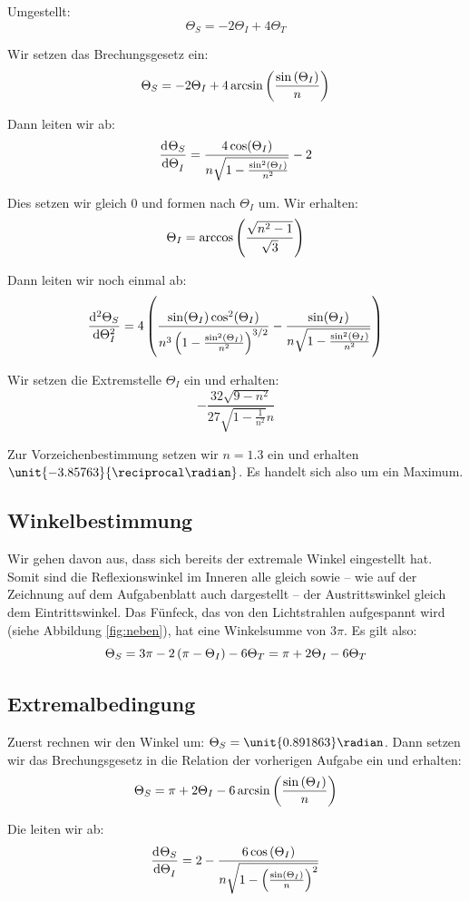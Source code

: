 \documentclass[11pt, ngerman, fleqn]{article}
\begin{document}
Umgestellt:
\[
	\Theta_S = - 2 \Theta_I + 4 \Theta_T
\]

Wir setzen das Brechungsgesetz ein:
\[
	\Theta_S = - 2 \Theta_I + 4 \arcsin\del{\frac{\sin\del{\Theta_I}} n}
\]

Dann leiten wir ab:
\[
	\dod{\Theta_S}{\Theta_I} = \frac{4 \cos (\Theta_I)}{n \sqrt{1-\frac{\sin ^2(\Theta_I)}{n^2}}}-2 
\]

Dies setzen wir gleich 0 und formen nach $\Theta_I$ um. Wir erhalten:
\[
	\Theta_I = \arccos\del{\frac{\sqrt{n^2-1}}{\sqrt{3}}}
\]

Dann leiten wir noch einmal ab:
\[
	\dod[2]{\Theta_S}{\Theta_I} = 4 \left(\frac{\sin (\Theta_I) \cos ^2(\Theta_I)}{n^3 \left(1-\frac{\sin ^2(\Theta_I)}{n^2}\right)^{3/2}}-\frac{\sin (\Theta_I)}{n \sqrt{1-\frac{\sin ^2(\Theta_I)}{n^2}}}\right) 
\]

Wir setzen die Extremstelle $\Theta_I$ ein und erhalten:
\[
	-\frac{32 \sqrt{9-n^2}}{27 \sqrt{1-\frac{1}{n^2}} n}
\]

Zur Vorzeichenbestimmung setzen wir $n = 1.3$ ein und erhalten
$\unit{-3.85763}{\reciprocal\radian}$. Es handelt sich also um ein Maximum.

\subsection{Winkelbestimmung}

Wir gehen davon aus, dass sich bereits der extremale Winkel eingestellt hat.
Somit sind die Reflexionswinkel im Inneren alle gleich sowie -- wie auf der
Zeichnung auf dem Aufgabenblatt auch dargestellt -- der Austrittswinkel gleich
dem Eintrittswinkel. Das Fünfeck, das von den Lichtstrahlen aufgespannt wird
(siehe Abbildung \ref{fig:neben}), hat eine Winkelsumme von $3 \pi$. Es gilt
also:
\[
	\Theta_S = 3 \pi - 2 \del{\pi - \Theta_I} - 6 \Theta_T
	= \pi + 2 \Theta_I - 6 \Theta_T
\]

\subsection{Extremalbedingung}

Zuerst rechnen wir den Winkel um: $\Theta_S = \unit{0.891863}\radian$. Dann setzen wir das Brechungsgesetz in die Relation der vorherigen Aufgabe ein und erhalten:
\[
	\Theta_S = \pi + 2 \Theta_I - 6 \arcsin\del{\frac{\sin\del{\Theta_I}} n}
\]

Die leiten wir ab:
\[
	\dod{\Theta_S}{\Theta_I} = 2 - \frac{6 \cos{\del{\Theta_I}}}{n \sqrt{1 - \del{\frac{\sin\del{\Theta_I}}n}^2}}
\]
\end{document}
